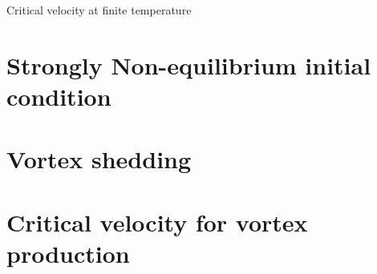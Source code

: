 \begin{chapter}{\label{cha:nonequib}Critical velocity at finite temperature}
\section{\label{section:cleanIC} Strongly Non-equilibrium initial condition}
\section{\label{section:vortexshedding} Vortex shedding}
\section{\label{section:critvel} Critical velocity for vortex production}
\end{chapter}
